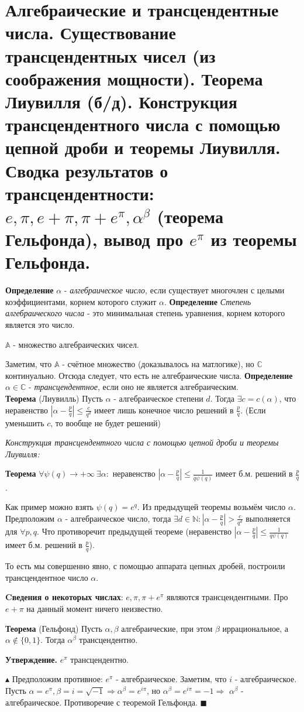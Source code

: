 \setcounter{section}{68}
\section{Алгебраические и трансцендентные числа. Существование трансцендентных чисел (из соображения мощности). Теорема Лиувилля (б/д). Конструкция трансцендентного числа с помощью цепной дроби и теоремы Лиувилля. Сводка результатов о трансцендентности: $e, \pi, e+\pi, \pi+e^{\pi}, \alpha^{\beta}$ (теорема Гельфонда), вывод про $e^{\pi}$ из теоремы Гельфонда.}

\textbf{Определение} $\alpha$ - \textit{алгебраическое число}, если существует многочлен с целыми коэффициентами, корнем которого служит $\alpha$.
\textbf{Определение} \textit{Степень алгебраического числа} - это минимальная степень уравнения, корнем которого является это число.

$\mathbb{A}$ - множество алгебраических чисел.

Заметим, что $\mathbb{A}$ - счётное множество (доказывалось на матлогике), но $\mathbb{C}$ континуально. Отсюда следует, что есть не алгебраические числа.
\textbf{Определение} $\alpha \in \mathbb{C}$ - \textit{трансцендентное}, если оно не является алгебраическим.\\

\textbf{Теорема} (Лиувилль) Пусть $\alpha$ - алгебраическое степени $d$. Тогда $\exists c = c(\alpha)$, что неравенство $|\alpha - \frac{p}{q}| \leq \frac{c}{q^d}$ имеет лишь конечное число решений в $\frac{p}{q}$. (Если уменьшить $c$, то вообще не будет решений)

\textit{Конструкция трансцендентного числа с помощью цепной дроби и теоремы Лиувилля:}

\textbf{Теорема} $\forall \psi(q) \rightarrow +\infty \ \exists \alpha:$ неравенство $|\alpha - \frac{p}{q}| \leq \frac{1}{q \psi(q)}$ имеет б.м. решений в $\frac{p}{q}$.

Как пример можно взять $\psi(q) = e^q$. Из предыдущей теоремы возьмём число $\alpha$. Предположим $\alpha$ - алгебраическое число, тогда $\exists d \in \mathbb{N}: |\alpha - \frac{p}{q}| > \frac{c}{q^d}$ выполняется для $\forall p, q$. Что противоречит предыдущей теореме (неравенство $|\alpha - \frac{p}{q}| \leq \frac{1}{q \psi(q)}$ имеет б.м. решений в $\frac{p}{q}$). 

То есть мы совершенно явно, с помощью аппарата цепных дробей, построили трансцендентное число $\alpha$. 

\textbf{Cведения о некоторых числах}:
$e, \pi, \pi + e^{\pi}$ являются трансцендентными. Про $e + \pi$ на данный момент ничего неизвестно.

\textbf{Теорема} (Гельфонд) Пусть $\alpha, \beta$ алгебраические, при этом $\beta$ иррациональное, а $\alpha \notin \{0, 1\}$. Тогда $\alpha^{\beta}$ трансцендентно.

\textbf{Утверждение.} $e^\pi$ трансцендентно.

$\blacktriangle$ Предположим противное: $e^{\pi}$ - алгебраическое. Заметим, что $i$ - алгебраическое. Пусть $\alpha = e^{\pi}, \beta = i = \sqrt{-1} \Rightarrow \alpha^{\beta} = e^{i\pi}$, но $\alpha^{\beta} =e^{i\pi} = -1 \Rightarrow$ $\alpha^{\beta}$ - алгебраическое. Противоречие с теоремой Гельфонда.
$\blacksquare$